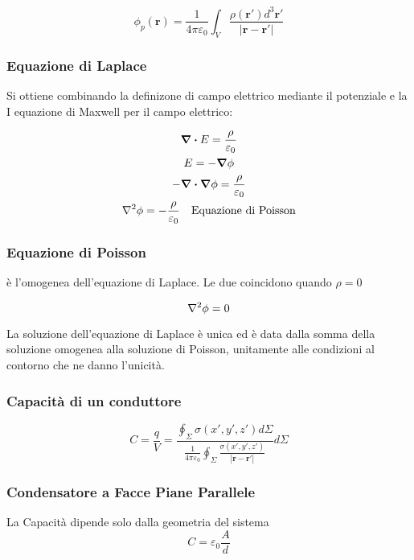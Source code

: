 \documentclass[a4paper]{scrarticle}
\begin{document}
\begin{equation}
    \phi_p(\bm r) = \frac{1}{4\pi\varepsilon_0}\int_{V}\frac{\rho(\bm r') d^3\bm r'}{\left|\bm r - \bm r'\right|}
\end{equation}


\subsubsection*{Equazione di Laplace}

Si ottiene combinando la definizone di campo elettrico mediante il potenziale e la I equazione di Maxwell per il campo elettrico:

\begin{gather*}
    \div E = \frac{\rho}{\varepsilon_0}\\
    E = - \grad \phi\\
    - \div \grad \phi = \frac{\rho}{\varepsilon_0}\\
    \laplacian \phi = -\frac{\rho}{\varepsilon_0} \quad \text{Equazione di Poisson}
\end{gather*}

\subsubsection*{Equazione di Poisson}

è l'omogenea dell'equazione di Laplace. Le due coincidono quando $\rho = 0$

\begin{equation}
    \laplacian \phi = 0
\end{equation}

La soluzione dell'equazione di Laplace è unica ed è data dalla somma della soluzione omogenea alla soluzione di Poisson, unitamente alle condizioni al contorno che ne danno l'unicità.

\subsubsection*{Capacità di un conduttore}

\begin{equation}
    C = \frac{q}{V} = 
    \frac{\displaystyle \oint_\Sigma \sigma (x',y',z') d\Sigma}{\displaystyle \frac{1}{4\pi\varepsilon_0} \oint_\Sigma \frac{\sigma(x',y',z')}{\left| \bm{r} - \bm{r'} \right|}} d\Sigma
\end{equation}

\subsubsection*{Condensatore a Facce Piane Parallele}
La Capacità dipende solo dalla geometria del sistema
\begin{equation*}
    C = \varepsilon_0 \frac{A}{d}
\end{equation*}
\end{document}

